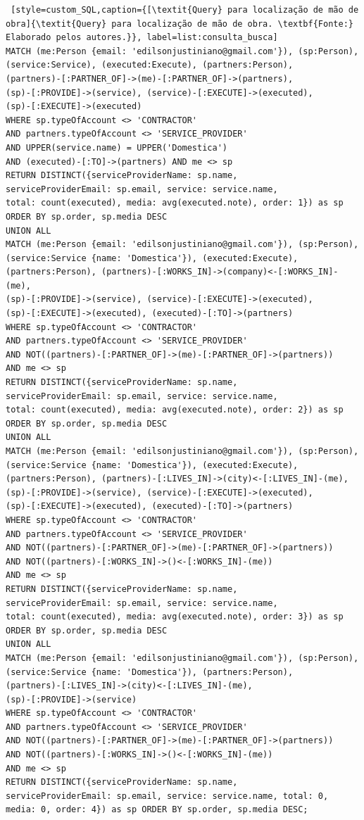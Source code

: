 \begin{lstlisting} [style=custom_SQL,caption={[\textit{Query} para localização de mão de obra]{\textit{Query} para localização de mão de obra. \textbf{Fonte:} Elaborado pelos autores.}}, label=list:consulta_busca] 	
MATCH (me:Person {email: 'edilsonjustiniano@gmail.com'}), (sp:Person), 
(service:Service), (executed:Execute), (partners:Person), 
(partners)-[:PARTNER_OF]->(me)-[:PARTNER_OF]->(partners),
(sp)-[:PROVIDE]->(service), (service)-[:EXECUTE]->(executed),
(sp)-[:EXECUTE]->(executed)
WHERE sp.typeOfAccount <> 'CONTRACTOR' 
AND partners.typeOfAccount <> 'SERVICE_PROVIDER'
AND UPPER(service.name) = UPPER('Domestica')
AND (executed)-[:TO]->(partners) AND me <> sp
RETURN DISTINCT({serviceProviderName: sp.name, 
serviceProviderEmail: sp.email, service: service.name,
total: count(executed), media: avg(executed.note), order: 1}) as sp 
ORDER BY sp.order, sp.media DESC
UNION ALL
MATCH (me:Person {email: 'edilsonjustiniano@gmail.com'}), (sp:Person),
(service:Service {name: 'Domestica'}), (executed:Execute),
(partners:Person), (partners)-[:WORKS_IN]->(company)<-[:WORKS_IN]-(me),
(sp)-[:PROVIDE]->(service), (service)-[:EXECUTE]->(executed), 
(sp)-[:EXECUTE]->(executed), (executed)-[:TO]->(partners)
WHERE sp.typeOfAccount <> 'CONTRACTOR' 
AND partners.typeOfAccount <> 'SERVICE_PROVIDER'
AND NOT((partners)-[:PARTNER_OF]->(me)-[:PARTNER_OF]->(partners))
AND me <> sp
RETURN DISTINCT({serviceProviderName: sp.name, 
serviceProviderEmail: sp.email, service: service.name, 
total: count(executed), media: avg(executed.note), order: 2}) as sp 
ORDER BY sp.order, sp.media DESC
UNION ALL
MATCH (me:Person {email: 'edilsonjustiniano@gmail.com'}), (sp:Person),
(service:Service {name: 'Domestica'}), (executed:Execute), 
(partners:Person), (partners)-[:LIVES_IN]->(city)<-[:LIVES_IN]-(me),
(sp)-[:PROVIDE]->(service), (service)-[:EXECUTE]->(executed), 
(sp)-[:EXECUTE]->(executed), (executed)-[:TO]->(partners)
WHERE sp.typeOfAccount <> 'CONTRACTOR' 
AND partners.typeOfAccount <> 'SERVICE_PROVIDER'
AND NOT((partners)-[:PARTNER_OF]->(me)-[:PARTNER_OF]->(partners))
AND NOT((partners)-[:WORKS_IN]->()<-[:WORKS_IN]-(me))
AND me <> sp
RETURN DISTINCT({serviceProviderName: sp.name, 
serviceProviderEmail: sp.email, service: service.name, 
total: count(executed), media: avg(executed.note), order: 3}) as sp 
ORDER BY sp.order, sp.media DESC 
UNION ALL
MATCH (me:Person {email: 'edilsonjustiniano@gmail.com'}), (sp:Person),
(service:Service {name: 'Domestica'}), (partners:Person),
(partners)-[:LIVES_IN]->(city)<-[:LIVES_IN]-(me), 
(sp)-[:PROVIDE]->(service)
WHERE sp.typeOfAccount <> 'CONTRACTOR' 
AND partners.typeOfAccount <> 'SERVICE_PROVIDER'
AND NOT((partners)-[:PARTNER_OF]->(me)-[:PARTNER_OF]->(partners))
AND NOT((partners)-[:WORKS_IN]->()<-[:WORKS_IN]-(me))
AND me <> sp
RETURN DISTINCT({serviceProviderName: sp.name, 
serviceProviderEmail: sp.email, service: service.name, total: 0,
media: 0, order: 4}) as sp ORDER BY sp.order, sp.media DESC;
\end{lstlisting}


